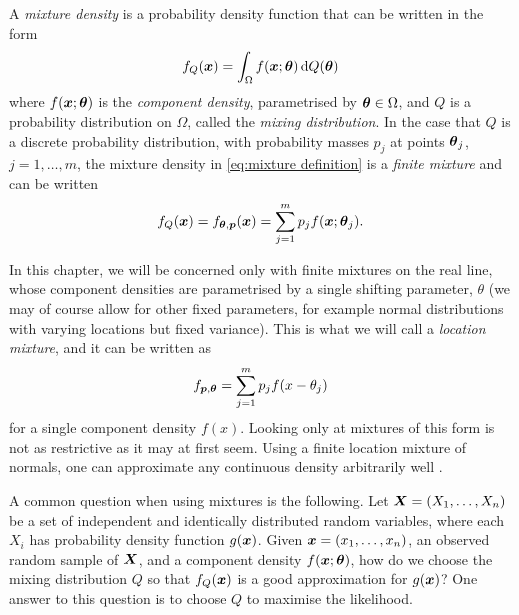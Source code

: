 
	A \emph{mixture density} is a probability density function that can be written in the form
	\begin{equation}
		f_Q({\bm{{x}}}) = \int_\Omega f({\bm{{x}}}; {\bm{{\theta}}}) \, \mathrm{d} Q({\bm{{\theta}}})
		\label{eq:mixture definition}
	\end{equation}
	where $f({\bm{{x}}};{\bm{{\theta}}})$ is the \emph{component density}, parametrised by ${\bm{{\theta}}} \in \Omega$, and $Q$ is a probability distribution on $\Omega$, called the \emph{mixing distribution}. In the case that $Q$ is a discrete probability distribution, with probability masses $p_j$ at points ${\bm{{\theta}}}_j$, $j = 1, \dots, m$, the mixture density in \eqref{eq:mixture definition} is a \emph{finite mixture} and can be written
	\begin{equation}
		f_Q({\bm{{x}}}) = f_{{\bm{{\theta}}}, {\bm{{p}}}}({\bm{{x}}}) = \sum_{j = 1}^m p_j f({\bm{{x}}}; {\bm{{\theta}}}_j).
	\end{equation}

	In this chapter, we will be concerned only with finite mixtures on the real line, whose component densities are parametrised by a single shifting parameter, $\theta$ (we may of course allow for other fixed parameters, for example normal distributions with varying locations but fixed variance). This is what we will call a \emph{location mixture}, and it can be written as
	\begin{equation}
		f_{{\bm{{p}}}, {\bm{{\theta}}}} = \sum_{j = 1}^m p_j f(x - \theta_j)
		\label{eq:location mixture}
	\end{equation}
	for a single component density $f(x)$.
	Looking only at mixtures of this form is not as restrictive as it may at first seem. Using a finite location mixture of normals, one can approximate any continuous density arbitrarily well \cite{Nguyen2018-qx}.

	A common question when using mixtures is the following. Let ${\bm{{X}}} = (X_1, \dots, X_n)$ be a set of independent and identically distributed random variables, where each $X_i$ has probability density function $g({\bm{{x}}})$. Given ${\bm{{x}}} = (x_1, \dots, x_n)$, an observed random sample of ${\bm{{X}}}$, and a component density $f({\bm{{x}}}; {\bm{{\theta}}})$, how do we choose the mixing distribution $Q$ so that $f_Q({\bm{{x}}})$ is a good approximation for $g({\bm{{x}}})$?	One answer to this question is to choose $Q$ to maximise the likelihood.

